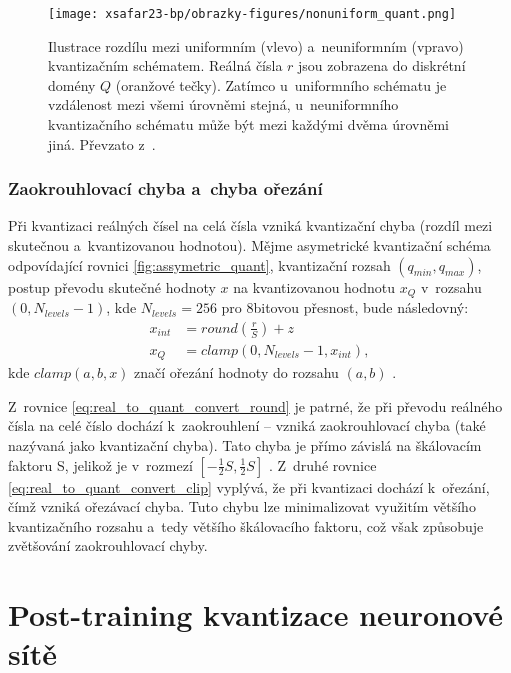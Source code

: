 \begin{figure}[H]
	\centering
	\texttt{[image: xsafar23-bp/obrazky-figures/nonuniform\_quant.png]}
	\caption{Ilustrace rozdílu mezi uniformním (vlevo) a~neuniformním (vpravo) kvantizačním schématem. Reálná čísla $r$ jsou zobrazena do diskrétní domény $Q$ (oranžové tečky). Zatímco u~uniformního schématu je vzdálenost mezi všemi úrovněmi stejná, u~neuniformního kvantizačního schématu může být mezi každými dvěma úrovněmi jiná. Převzato z~\cite{gholami2021survey}.}
	\label{fig:uniformvsnonuniform} 
\end{figure}

\subsubsection{Zaokrouhlovací chyba a~chyba ořezání}
\label{section:round_clipp_error}

Při kvantizaci reálných čísel na celá čísla vzniká kvantizační chyba (rozdíl mezi skutečnou a~kvantizovanou hodnotou). Mějme asymetrické kvantizační schéma odpovídající rovnici \eqref{fig:assymetric_quant}, kvantizační rozsah $(q_{min},q_{max})$, postup převodu skutečné hodnoty $x$ na kvantizovanou hodnotu $x_{Q}$ v~rozsahu $(0,N_{levels}-1)$, kde $N_{levels} = 256$ pro 8bitovou přesnost, bude následovný:
\begin{align}
    \label{eq:real_to_quant_convert_round}
    x_{int} &= round(\frac{r}{S}) + z~\\
    \label{eq:real_to_quant_convert_clip}
    x_{Q} &= clamp(0,N_{levels} - 1, x_{int}),
\end{align}
kde $clamp(a,b,x)$ značí ořezání hodnoty do rozsahu $(a,b)$ \cite{krishnamoorthi2018quantizing}.

Z~rovnice \eqref{eq:real_to_quant_convert_round} je patrné, že při převodu reálného čísla na celé číslo dochází k~zaokrouhlení -- vzniká zaokrouhlovací chyba (také nazývaná jako kvantizační chyba). Tato chyba je přímo závislá na škálovacím faktoru S, jelikož je v~rozmezí $[-\frac{1}{2} S , \frac{1}{2} S]$ \cite{nagel2021white}. Z~druhé rovnice \eqref{eq:real_to_quant_convert_clip} vyplývá, že při kvantizaci dochází k~ořezání, čímž vzniká ořezávací chyba. Tuto chybu lze minimalizovat využitím většího kvantizačního rozsahu a~tedy většího škálovacího faktoru, což však způsobuje zvětšování zaokrouhlovací chyby.

\section{Post-training kvantizace neuronové sítě}
\label{section:post-training}


